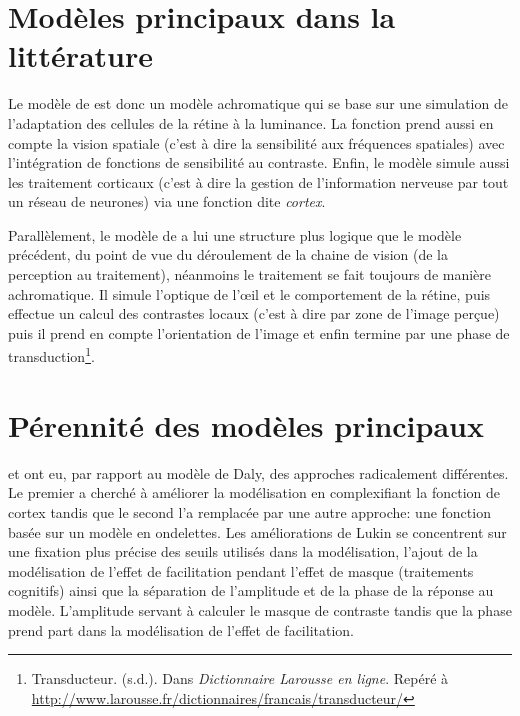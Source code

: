 	\section{Modèles principaux dans la littérature}
	\par Le modèle de \citep{daly_visible_1992} est donc un modèle achromatique qui se base sur une simulation de l'adaptation des cellules de la rétine à la luminance. La fonction prend aussi en compte la vision spatiale (c'est à dire la sensibilité aux fréquences spatiales) avec l'intégration de fonctions de sensibilité au contraste. Enfin, le modèle simule aussi les traitement corticaux (c'est à dire la gestion de l'information nerveuse par tout un réseau de neurones) via une fonction dite \textit{cortex}.
		
	\par Parallèlement, le modèle de \citep{lubin_visual_1995} a lui une structure plus logique que le modèle précédent, du point de vue du déroulement de la chaine de vision (de la perception au traitement), néanmoins le traitement se fait toujours de manière achromatique. Il simule l'optique de l'œil et le comportement de la rétine, puis effectue un calcul des contrastes locaux (c'est à dire par zone de l'image perçue) puis il prend en compte l'orientation de l'image et enfin termine par une phase de transduction\footnote{Transducteur. (s.d.). Dans \textit{Dictionnaire Larousse en ligne}. Repéré à \url{http://www.larousse.fr/dictionnaires/francais/transducteur/}}.
	
	\section{Pérennité des modèles principaux}
	\par \citep{lukin_improved_2009} et \citep{bradley_wavelet_1999} ont eu, par rapport au modèle de Daly, des approches radicalement différentes. Le premier a cherché à améliorer la modélisation en complexifiant la fonction de cortex tandis que le second l'a remplacée par une autre approche: une fonction basée sur un modèle en ondelettes.
	Les améliorations de Lukin se concentrent sur une fixation plus précise des seuils utilisés dans la modélisation, l'ajout de la modélisation de l'effet de facilitation pendant l'effet de masque (traitements cognitifs) ainsi que la séparation de l'amplitude et de la phase de la réponse au modèle. L'amplitude servant à calculer le masque de contraste tandis que la phase prend part dans la modélisation de l'effet de facilitation.
	
